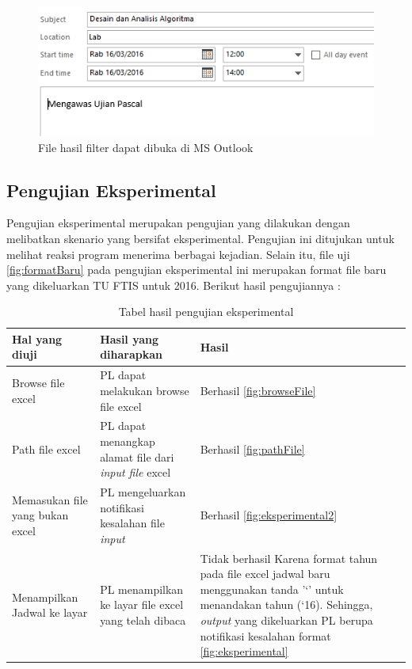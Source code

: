 \begin{enumerate}
			\begin{figure}[H]
			\centering
			\includegraphics[scale=0.8]{Gambar/hasilOutlookFilter}
			\caption{File hasil filter dapat dibuka di MS Outlook }
			\label{fig:hasilOutlookFilter}
			\end{figure}
			
\end{enumerate} 

\subsection{Pengujian Eksperimental}
Pengujian eksperimental merupakan pengujian yang dilakukan dengan melibatkan skenario yang bersifat eksperimental. Pengujian ini ditujukan untuk melihat reaksi program menerima berbagai kejadian. Selain itu, file uji \ref{fig:formatBaru} pada pengujian eksperimental ini merupakan format file baru yang dikeluarkan TU FTIS untuk 2016. Berikut hasil pengujiannya :
\begin{table}[H]
	\centering
		\caption{Tabel hasil pengujian eksperimental}
		\label{tab:eksperimental}
		\begin{tabular}{ | p{4cm} | p{4cm} | p{4cm} | }
			\hline
				Hal yang diuji & Hasil yang diharapkan & Hasil \\ \hline
				Browse file excel & PL dapat melakukan browse file excel & Berhasil \ref{fig:browseFile}\\ \hline
				Path file excel & PL dapat menangkap alamat file dari \textit{input file} excel & Berhasil \ref{fig:pathFile} \\ \hline
				Memasukan file yang bukan excel & PL mengeluarkan notifikasi kesalahan file \textit{input} & Berhasil \ref{fig:eksperimental2} \\ \hline
				Menampilkan Jadwal ke layar & PL menampilkan ke layar file excel yang telah dibaca & Tidak berhasil Karena format tahun pada file excel jadwal baru menggunakan tanda '`' untuk menandakan tahun (`16). Sehingga, \textit{output} yang dikeluarkan PL berupa notifikasi kesalahan format  \ref{fig:eksperimental} \\ \hline
		\end{tabular}
\end{table}

